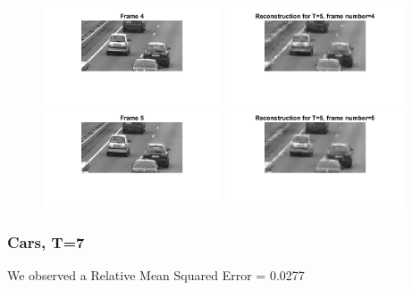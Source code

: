 \documentclass[a4paper,11pt]{article}
\numberwithin{definition}{section}
\numberwithin{mytheorem}{subsection}
\begin{document}
\begin{figure}[H]
    \includegraphics[width=200px]{"Frame 4.png"}
    \includegraphics[width=200px]{"Reconstruction- T=5, frame number=4.png"}
    \includegraphics[width=200px]{"Frame 5.png"}
    \includegraphics[width=200px]{"Reconstruction- T=5, frame number=5.png"}
\end{figure}

\newpage

\subsubsection{Cars, T=7}

We observed a Relative Mean Squared Error =  0.0277
\end{document}
